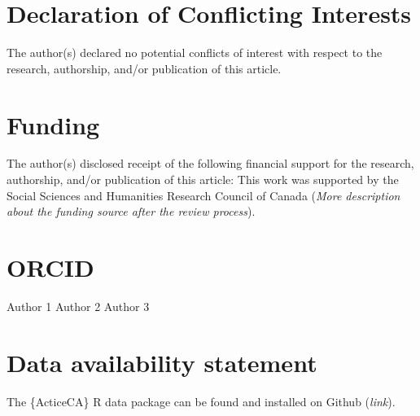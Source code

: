 \documentclass[Royal,times,sageh]{sagej}
\begin{document}
\hypertarget{declaration-of-conflicting-interests}{%
\section{Declaration of Conflicting
Interests}\label{declaration-of-conflicting-interests}}

The author(s) declared no potential conflicts of interest with respect
to the research, authorship, and/or publication of this article.

\hypertarget{funding}{%
\section{Funding}\label{funding}}

The author(s) disclosed receipt of the following financial support for
the research, authorship, and/or publication of this article: This work
was supported by the Social Sciences and Humanities Research Council of
Canada (\emph{More description about the funding source after the review
process}).

\hypertarget{orcid}{%
\section{ORCID}\label{orcid}}

Author 1 Author 2 Author 3

\hypertarget{data-availability-statement}{%
\section{Data availability
statement}\label{data-availability-statement}}

The \{ActiceCA\} R data package can be found and installed on Github
(\emph{link}).



\end{document}
